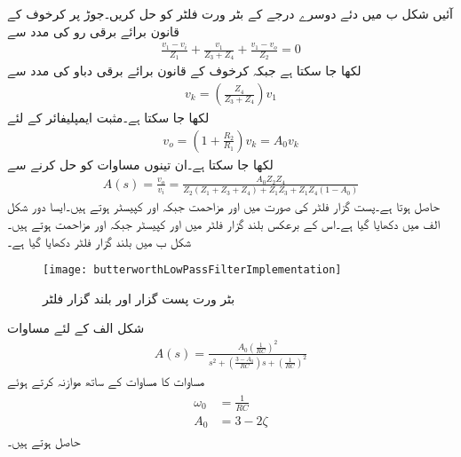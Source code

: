 آئیں شکل  ب میں دئے دوسرے درجے کے بٹر ورت فلٹر کو حل کریں۔جوڑ  پر کرخوف کے قانون برائے برقی رو کی مدد سے
\begin{align*}
\frac{v_1-v_i}{Z_1}+\frac{v_1}{Z_3+Z_4}+\frac{v_1-v_o}{Z_2}=0
\end{align*}
لکھا جا سکتا ہے جبکہ کرخوف کے قانون برائے برقی دباو کی مدد سے 
\begin{align*}
v_k= \left(\frac{Z_4}{Z_3+Z_4} \right) v_1
\end{align*}
لکھا جا سکتا ہے۔مثبت ایمپلیفائر کے لئے
\begin{align*}
v_o=\left(1+\frac{R_2}{R_1}\right) v_k=A_0 v_k
\end{align*}
لکھا جا سکتا ہے۔ان تینوں مساوات کو حل کرنے سے
\begin{align}\label{مساوات_تعددی_دو_درجی_بٹرورت_فلٹر_کی_افزائش}
A(s)=\frac{v_o}{v_i}=\frac{A_0 Z_2 Z_4}{Z_2 \left(Z_1+Z_3+Z_4 \right)+Z_1 Z_3+Z_1 Z_4 \left(1-A_0 \right)}
\end{align}
حاصل ہوتا ہے۔پست گزار فلٹر کی صورت میں  اور  مزاحمت جبکہ  اور  کپیسٹر ہوتے ہیں۔ایسا دور شکل  الف میں دکھایا گیا ہے۔اس کے برعکس بلند گزار فلٹر میں  اور  کپیسٹر جبکہ  اور  مزاحمت ہوتے ہیں۔شکل  ب میں بلند گزار فلٹر دکھایا گیا ہے۔  
\begin{figure}
\centering
\texttt{[image: butterworthLowPassFilterImplementation]}
\caption{بٹر ورت پست گزار اور بلند گزار فلٹر}
\label{شکل_تعددی_ردعمل_بٹر_ورت_فلٹر_پست_بلند_گزار}
\end{figure}

شکل  الف کے لئے مساوات 
\begin{align}\label{مساوات_تعددی_دو_درجی_بٹرورت_پست_گزار_فلٹر_کی_افزائش}
A(s)=\frac{A_0 \left(\frac{1}{RC} \right)^2}{s^2+\left(\frac{3-A_0}{RC} \right) s+ \left(\frac{1}{RC} \right)^2}
\end{align}
مساوات  کا مساوات  کے ساتھ موازنہ  کرتے ہوئے
\begin{gather}
\begin{aligned}\label{مساوات_تعددی_ردعمل_بٹرورت_تخلیقی_مساوات}
\omega_0&=\frac{1}{RC}\\
A_0&=3-2 \zeta
\end{aligned}
\end{gather}
حاصل ہوتے ہیں۔

